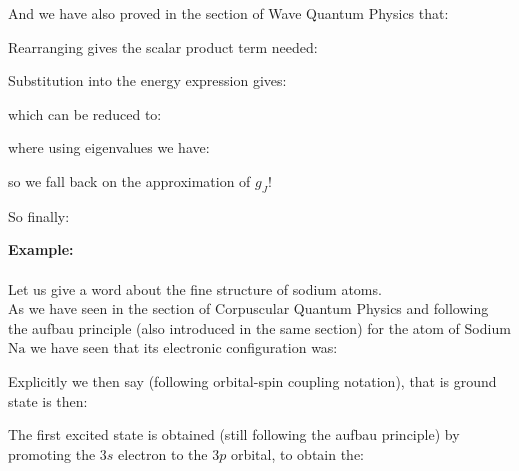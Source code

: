 	And we have also proved in the section of Wave Quantum Physics that:
	
	Rearranging gives the scalar product term needed:
	
	Substitution into the energy expression gives:
	
	which can be reduced to:
	
	where using eigenvalues we have:
	
	so we fall back on the approximation of $g_J$!
	
	So finally:
	
	
	\begin{tcolorbox}[colframe=black,colback=white,sharp corners]
	\textbf{{\Large {}}Example:}\\\\
	Let us give a word about the fine structure of sodium atoms.\\
	
	As we have seen in the section of Corpuscular Quantum Physics and following the aufbau principle (also introduced in the same section) for the atom of Sodium $\mathrm{Na}$ we have seen that its electronic configuration was:
	
	Explicitly we then say (following orbital-spin coupling notation), that is ground state is then:
	
	The first excited state is obtained (still following the aufbau principle) by promoting the $3s$ electron to the $3p$ orbital, to obtain the:	
	\end{tcolorbox}
	
